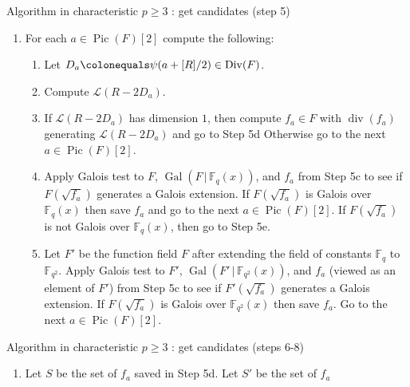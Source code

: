 \documentclass[xcolor=dvipsnames,handout]{beamer}
\theoremstyle{plain}
\newcommand{\FF}{\mathbb{F}}
\DeclareMathOperator{\Div}{Div}
\DeclareMathOperator{\Pic}{Pic}
\DeclareMathOperator{\ddiv}{div}
\DeclareMathOperator{\Gal}{Gal}
\begin{document}
{\begin{frame}{Algorithm in characteristic $p\geq 3$ : get candidates (step 5)}
\begin{enumerate}
        \item[5.]
          For each $a\in\Pic(F)[2]$ compute the
          following:
          \pause
          \begin{enumerate}
            \item[(a)]
              Let $D_a\colonequals\psi(a+[R]/2)
              \in\Div(F)$.
              \pause
            \item[(b)]
              Compute $\mathscr{L}(R-2D_a)$.
              \pause
            \item[(c)]
              If $\mathscr{L}(R-2D_a)$ has dimension
              $1$, then compute
              $f_a\in F$ with $\ddiv(f_a)$
              generating $\mathscr{L}(R-2D_a)$
              and go to Step 5d
              Otherwise go to the next
              $a\in\Pic(F)[2]$.
              \pause
            \item[(d)]
              Apply Galois test
              to $F$,
              $\Gal(F\,|\,\FF_q(x))$,
              and $f_a$
              from Step 5c
              to see if $F(\sqrt{f_a})$
              generates a Galois extension.
              If $F(\sqrt{f_a})$ is Galois over
              $\FF_q(x)$ then save $f_a$
              and
              go to the next
              $a\in\Pic(F)[2]$.
              If $F(\sqrt{f_a})$ is not Galois
              over $\FF_q(x)$, then go to
              Step 5e.
              \pause
            \item[(e)]
              Let $F'$ be the function field
              $F$ after extending the field of
              constants $\FF_q$ to $\FF_{q^2}$.
              Apply Galois test
              to $F'$,
              $\Gal(F'\,|\,\FF_{q^2}(x))$,
              and $f_a$
              (viewed as an element of $F'$)
              from Step 5c
              to see if $F'(\sqrt{f_a})$
              generates a Galois extension.
              If $F(\sqrt{f_a})$ is Galois over
              $\FF_{q^2}(x)$ then save $f_a$.
              Go to the next
              $a\in\Pic(F)[2]$.
          \end{enumerate}
      \end{enumerate}
    \end{frame}
    \begin{frame}{Algorithm in characteristic $p\geq 3$ : get candidates (steps 6-8)}
      \begin{enumerate}
        \item[6.]
          Let $S$ be the set of $f_a$
          saved in Step 5d.
          Let $S'$ be the set of $f_a$

\end{enumerate}
\end{frame}}
\end{document}

